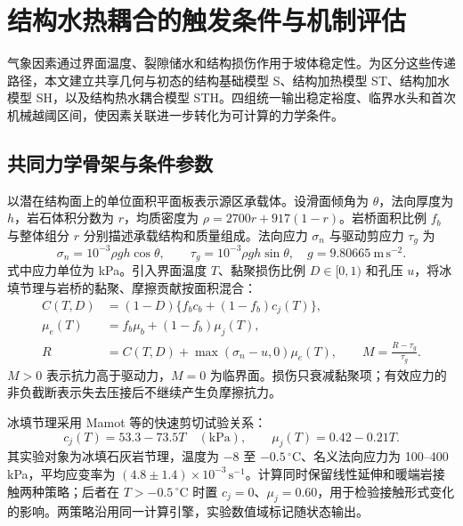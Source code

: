 \section{结构水热耦合的触发条件与机制评估}\label{q2:sec-model}

气象因素通过界面温度、裂隙储水和结构损伤作用于坡体稳定性。为区分这些传递路径，本文建立共享几何与初态的结构基础模型 S、结构加热模型 ST、结构加水模型 SH，以及结构热水耦合模型 STH。四组统一输出稳定裕度、临界水头和首次机械越阈区间，使因素关联进一步转化为可计算的力学条件。

\subsection{共同力学骨架与条件参数}\label{q2:sec-structure}

以潜在结构面上的单位面积平面板表示源区承载体。设滑面倾角为 $\theta$，法向厚度为 $h$，岩石体积分数为 $r$，均质密度为 $\rho=2700r+917(1-r)$。岩桥面积比例 $f_b$ 与整体组分 $r$ 分别描述承载结构和质量组成。法向应力 $\sigma_n$ 与驱动剪应力 $\tau_g$ 为
\begin{equation}
  \sigma_n=10^{-3}\rho gh\cos\theta,\qquad
  \tau_g=10^{-3}\rho gh\sin\theta,
  \quad g=9.80665\ \mathrm{m\,s^{-2}}.
  \label{q2:eq-stress}
\end{equation}
式中应力单位为 kPa。引入界面温度 $T$、黏聚损伤比例 $D\in[0,1)$ 和孔压 $u$，将冰填节理与岩桥的黏聚、摩擦贡献按面积混合：
\begin{equation}
\begin{aligned}
 C(T,D)&=(1-D)\{f_bc_b+(1-f_b)c_j(T)\},\\
 \mu_e(T)&=f_b\mu_b+(1-f_b)\mu_j(T),\\
 R&=C(T,D)+\max(\sigma_n-u,0)\mu_e(T),\qquad
 M=\frac{R-\tau_g}{\tau_g}.
\end{aligned}\label{q2:eq-resistance}
\end{equation}
$M>0$ 表示抗力高于驱动力，$M=0$ 为临界面。损伤只衰减黏聚项；有效应力的非负截断表示失去压接后不继续产生负摩擦抗力。

冰填节理采用 Mamot 等的快速剪切试验关系\cite{q2-mamot2018}：
\begin{equation}
 c_j(T)=53.3-73.5T\quad(\mathrm{kPa}),\qquad
 \mu_j(T)=0.42-0.21T.\label{q2:eq-strength}
\end{equation}
其实验对象为冰填石灰岩节理，温度为 $-8$ 至 $-0.5\,^{\circ}\mathrm C$、名义法向应力为 100--400 kPa，平均应变率为 $(4.8\pm1.4)\times10^{-3}\,\mathrm{s^{-1}}$。计算同时保留线性延伸和暖端岩接触两种策略；后者在 $T>-0.5\,^{\circ}\mathrm C$ 时置 $c_j=0$、$\mu_j=0.60$，用于检验接触形式变化的影响。两策略沿用同一计算引擎，实验数值域标记随状态输出。

